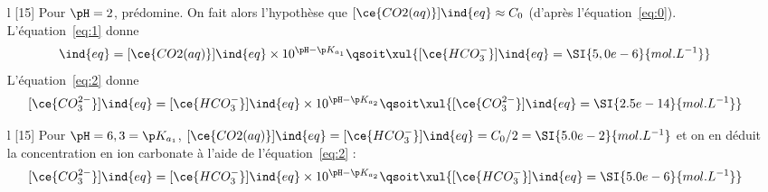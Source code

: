 \documentclass[../DS08.tex]{subfiles}%
\begin{document}
{\begin{itemize}%
	\item[l][15]{}%
	Pour $\pH=2$,  prédomine. On fait alors
	l'hypothèse que $[\ce{CO2(aq)}]\ind{eq}\approx C_0$ (d'après
	l'équation~\eqref{eq:0}). L'équation~\eqref{eq:1} donne
	\begin{gather*}
		[\ce{HCO^-_3}]\ind{eq} =
		[\ce{CO2(aq)}]\ind{eq}\times 10^{\pH-\p K_{a_1}}
		\qsoit
		\xul{[\ce{HCO^-_3}]\ind{eq}=\SI{5,0e-6}{mol.L^{-1}}}%
	\end{gather*}
	L'équation~\eqref{eq:2} donne
	\[
		[\ce{CO^{2-}_3}]\ind{eq} =
		[\ce{HCO^-_3}]\ind{eq}\times 10^{\pH-\p K_{a_2}}
		\qsoit
		\xul{[\ce{CO^{2-}_3}]\ind{eq}=\SI{2.5e-14}{mol.L^{-1}}}
	\]
	\item[l][15]{}%
	Pour $\pH=6,3=\p K_{a_1} $, $[\ce{CO2(aq)}]\ind{eq}=[\ce{HCO^-_3}]\ind{eq} =
		C_0/2 = \SI{5.0e-2}{mol.L^{-1}}$ et on en déduit la concentration en ion
	carbonate à l'aide de l'équation~\eqref{eq:2} :
	\[
		[\ce{CO^{2-}_3}]\ind{eq}=
		[\ce{HCO^-_3}]\ind{eq}\times 10^{\pH-\p K_{a_2}}
		\qsoit
		\xul{[\ce{HCO^-_3}]\ind{eq}=\SI{5.0e-6}{mol.L^{-1}}}
	\]


\end{itemize}}
\end{document}
